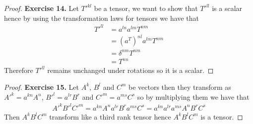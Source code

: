 \documentclass[11pt]{article}
\theoremstyle{definition}
\begin{document}
\begin{proof}{\textbf{Exercise 14.}}
    Let $T'^{kl}$ be a tensor, we want to show that
    $T'^{ll}$ is a scalar hence by using the transformation laws for
    tensors we have that
    \begin{align*}
        T'^{ll} &= a^{ln}a^{lm} T^{nm}\\
        &= (a^T)^{nl}a^{lm} T^{nm}\\
        &= \delta^{nm} T^{nm}\\
        &= T^{nn}
    \end{align*}
    Therefore $T'^{ll}$ remains unchanged under rotations so it is a scalar.
\end{proof}
\begin{proof}{\textbf{Exercise 15.}}
    Let $A^k$, $B^l$ and $C^m$ be vectors then they transform as
    $A'^k = a^{kn} A^n$, $B'^l = a^{lr}B^r$ and $C'^m = a^{ms}C^s$ so
    by multiplying them we have that
    \begin{align*}
        A'^k B'^l C'^m = a^{kn}A^n a^{lr}B^r a^{ms}C^s
            = a^{kn} a^{lr} a^{ms} A^n B^r C^s
    \end{align*}
    Then $A^k B^l C^m$ transform like a third rank tensor hence $A^k B^l C^m$
    is a tensor.
\end{proof}
\end{document}
